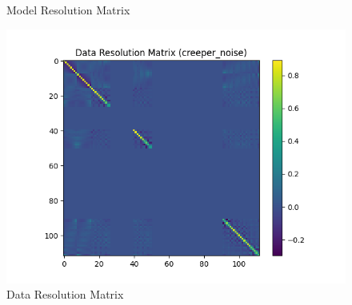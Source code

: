 \documentclass{article}
\begin{document}
\begin{itemize}
\begin{figure}[h]
        \caption{Model Resolution Matrix}
    \end{figure}
    \begin{figure}[h]
        \centering
        \includegraphics[width=1\textwidth]{images/outputs/datares/creeper_noise.png}
        \caption{Data Resolution Matrix}
    \end{figure}
    \clearpage



\end{itemize}
\end{document}
